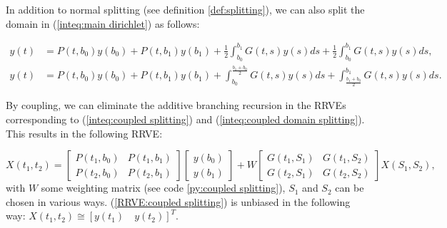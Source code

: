 \documentclass[a4paper,12pt]{article}
\begin{document}
\begin{example} \label{ex:coupled splitting}
    In addition to normal splitting (see definition \ref{def:splitting}),
    we can also split the domain in (\ref{inteq:main dirichlet})
    as follows:

    \begin{align}\label{inteq:coupled splitting}
        y(t) & = P(t,b_{0}) y(b_{0}) + P(t,b_{1}) y(b_{1}) +
        \frac{1}{2} \int_{b_{0}}^{b_{1}} G(t,s)y(s) ds +
        \frac{1}{2} \int_{b_{0}}^{b_{1}} G(t,s)y(s) ds,                                             \\
        y(t) & = P(t,b_{0}) y(b_{0}) + P(t,b_{1}) y(b_{1}) + \label{inteq:coupled domain splitting}
        \int_{b_{0}}^{\frac{b_{1}+b_{0}}{2}} G(t,s)y(s) ds +
        \int_{\frac{b_{1}+b_{0}}{2}}^{b_{1}} G(t,s)y(s) ds.
    \end{align}

    By coupling, we can eliminate the additive branching recursion
    in the RRVEs corresponding to (\ref{inteq:coupled splitting})
    and (\ref{inteq:coupled domain splitting}).
    This results in the following RRVE:

    \begin{equation} \label{RRVE:coupled splitting}
        X(t_{1},t_{2})=
        \begin{bmatrix}
            P(t_{1},b_{0}) & P(t_{1},b_{1}) \\
            P(t_{2},b_{0}) & P(t_{2},b_{1})
        \end{bmatrix}
        \begin{bmatrix}
            y(b_{0}) \\
            y(b_{1})
        \end{bmatrix}
        +
        W
        \begin{bmatrix}
            G(t_{1},S_{1}) & G(t_{1},S_{2}) \\
            G(t_{2},S_{1}) & G(t_{2},S_{2})
        \end{bmatrix}
        X(S_{1},S_{2}),
    \end{equation}
    with $W$ some weighting matrix
    (see code \ref{py:coupled splitting}),
    $S_{1}$ and $S_{2}$ can be chosen
    in various ways. (\ref{RRVE:coupled splitting}) is unbiased in the following way:
    $X(t_{1},t_{2}) \cong [y(t_{1}) \quad y(t_{2})]^{T}$.

\end{example}
\end{document}
